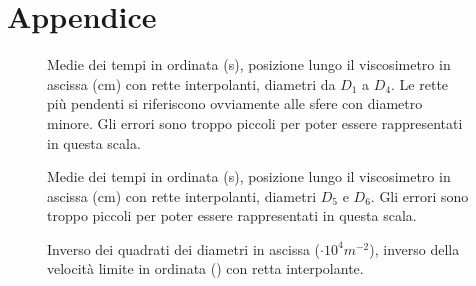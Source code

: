 \documentclass[italian,a4paper]{article}
\begin{document}
\section{Appendice}
\begin{figure}[hp]\caption{Medie dei tempi in ordinata (\unit{s}), posizione lungo il viscosimetro in ascissa (\unit{cm}) con rette interpolanti, diametri da $D_1$ a $D_4$. Le rette più pendenti si riferiscono ovviamente alle sfere con diametro minore. Gli errori sono troppo piccoli per poter essere rappresentati in questa scala.}\label{piccole}
\centering

\end{figure}
\begin{figure}[hp]\caption{Medie dei tempi in ordinata (\unit{s}), posizione lungo il viscosimetro in ascissa (\unit{cm}) con rette interpolanti, diametri $D_5$ e $D_6$. Gli errori sono troppo piccoli per poter essere rappresentati in questa scala.}\label{medie}
\centering

\end{figure}
\begin{figure}[p]\caption{Inverso dei quadrati dei diametri in ascissa ($\unit{\cdot 10^4 m^{-2}}$), inverso della velocità limite in ordinata () con retta interpolante.}\label{alter}
\centering

\end{figure}

\end{document}
